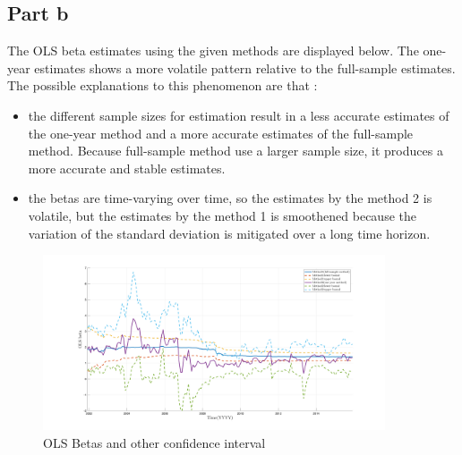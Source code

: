 \documentclass{report}
\begin{document}
\subsection{Part b}
The OLS beta estimates using the given methods are displayed below. The one-year estimates shows a more volatile pattern relative to the full-sample estimates. The possible explanations to this phenomenon are that :
\begin{itemize}
\item the different sample sizes for estimation result in a less accurate estimates of the one-year method and a more accurate estimates of the full-sample method. Because full-sample method use a larger sample size, it produces a more accurate and stable estimates.
\item the betas are time-varying over time, so the estimates by the method 2 is volatile, but the estimates by the method 1 is smoothened because the variation of the standard deviation is mitigated over a long time horizon.
\end{itemize}
\begin{figure}[H]
	\centering
	\includegraphics[width=0.9\textwidth]{figures/2B}
	\caption{OLS Betas and other confidence interval}
\end{figure}
\end{document}
